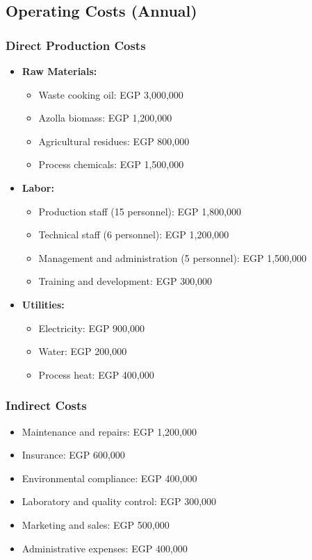 \subsection{Operating Costs (Annual)}

\subsubsection{Direct Production Costs}
\begin{itemize}
    \item \textbf{Raw Materials:}
    \begin{itemize}
        \item Waste cooking oil: EGP 3,000,000
        \item Azolla biomass: EGP 1,200,000
        \item Agricultural residues: EGP 800,000
        \item Process chemicals: EGP 1,500,000
    \end{itemize}
    
    \item \textbf{Labor:}
    \begin{itemize}
        \item Production staff (15 personnel): EGP 1,800,000
        \item Technical staff (6 personnel): EGP 1,200,000
        \item Management and administration (5 personnel): EGP 1,500,000
        \item Training and development: EGP 300,000
    \end{itemize}
    
    \item \textbf{Utilities:}
    \begin{itemize}
        \item Electricity: EGP 900,000
        \item Water: EGP 200,000
        \item Process heat: EGP 400,000
    \end{itemize}
\end{itemize}

\subsubsection{Indirect Costs}
\begin{itemize}
    \item Maintenance and repairs: EGP 1,200,000
    \item Insurance: EGP 600,000
    \item Environmental compliance: EGP 400,000
    \item Laboratory and quality control: EGP 300,000
    \item Marketing and sales: EGP 500,000
    \item Administrative expenses: EGP 400,000
\end{itemize}

